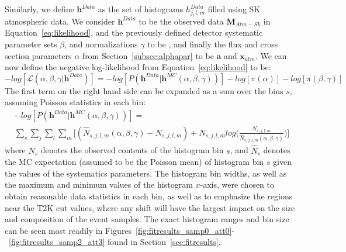 {Similarly, we define $\mathbf{h}^{Data}$ as the set of histograms
$h^{Data}_{j,l,m}$ filled using SK atmospheric data. We consider $
\mathbf{h}^{Data}$ to be the observed data $\mathbf{M}_{Atm-Sk}$ in
Equation~\ref{eq:likelihood}, and the previously defined detector systematic
parameter sets $\beta$, and normalizations $\gamma$ to be \ldsk, and finally
the flux and cross section parameters $\alpha$ from
Section~\ref{subsec:alphapar} to be $\mathbf{a}$ and $\mathbf{x}_{atm}$.  We can now define the
negative log-likelihood from Equation~\ref{eq:likelihood} to be:
%
\begin{equation}
  \label{eq:loglikelihood}
  -log[\mathcal{L}(\alpha,\beta,\gamma | \mathbf{h}^{Data} )] =
  -log[P( \mathbf{h}^{Data} | \mathbf{h}^{MC}(\alpha,\beta,\gamma))] - log[\pi(\alpha)]
  - log[\pi(\beta,\gamma)]
\end{equation}
%
The first term on the right hand side can be expanded as a sum over the bins
$s$, assuming Poisson statistics in each bin:
%
\begin{gather*}
  \label{eq:logpoisson}
  -log[P( \mathbf{h}^{Data} | \mathbf{h}^{MC}(\alpha,\beta,\gamma))] = \\
    \sum\limits_{s}^{} \sum\limits_{j}^{} \sum\limits_{l}^{} \sum\limits_{m}^{} 
   \bigg[ (\hat{N}_{s,j,l,m}(\alpha,\beta,\gamma) - N_{s,j,l,m}) +
  N_{s,j,l,m}log\bigg(\frac{N_{s,j,l,m}}{\hat{N}_{s,j,l,m}(\alpha,\beta,\gamma)}\bigg)\bigg]
\end{gather*}
%
where $N_{s}$ denotes the observed contents of the histogram bin $s$, and
$\hat{N}_{s}$ denotes the MC expectation (assumed to be the Poisson mean) of
histogram bin $s$ given the values of the systematics parameters.  The
histogram bin widths, as well as the maximum and minimum values of the
histogram $x$-axis, were chosen to obtain reasonable data statistics in each
bin, as well as to emphasize the regions near the T2K cut values, where any
shift will have the largest impact on the size and composition of the event
samples.  The exact histogram ranges and bin size can be seen most readily in 
Figures~\ref{fig:fitresults_samp0_att0}-~\ref{fig:fitresults_samp2_att3} found in 
Section~\ref{sec:fitresults}.

}

